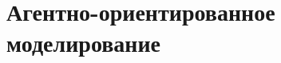 \documentclass[
    11pt, %
    aspectratio=169, %
]{beamer}
\begin{document}
\begin{frame}

\end{frame}



\section{Агентно-ориентированное моделирование}
\end{document}
